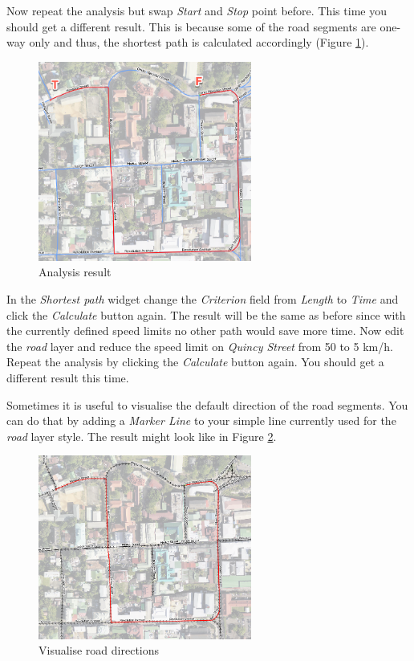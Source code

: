 \documentclass[a4paper,12pt,titlepage]{article}
\begin{document}
Now repeat the analysis but swap \textit{Start} and \textit{Stop} point before. This time you should get a different result. This is because some of the road segments are one-way only and thus, the shortest path is calculated accordingly (Figure \ref{fig:path1}).

\begin{figure}[htb]
	\centering
	\includegraphics[width=7cm]{Images/path1.png}
	\caption{Analysis result}\label{fig:path1}
\end{figure}

In the \textit{Shortest path} widget change the \textit{Criterion} field from \textit{Length} to \textit{Time} and click the \textit{Calculate} button again. The result will be the same as before since with the currently defined speed limits no other path would save more time. Now edit the \textit{road} layer and reduce the speed limit on \textit{Quincy Street} from 50 to 5 km/h. Repeat the analysis by clicking the \textit{Calculate} button again. You should get a different result this time.

Sometimes it is useful to visualise the default direction of the road segments. You can do that by adding a \textit{Marker Line} to your simple line currently used for the \textit{road} layer style. The result might look like in Figure \ref{fig:visualise_direction}.

\begin{figure}[htb]
	\centering
	\includegraphics[width=7cm]{Images/visualise_direction.png}
	\caption{Visualise road directions}\label{fig:visualise_direction}
\end{figure}
\end{document}
